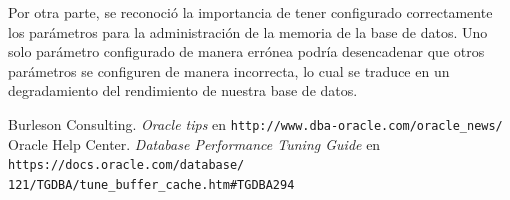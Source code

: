 \documentclass{article}
\begin{document}
Por otra parte, se reconoció la importancia de tener configurado correctamente
los parámetros para la administración de la memoria de la base de datos. Uno
solo parámetro configurado de manera errónea podría desencadenar que otros
parámetros se configuren de manera incorrecta, lo cual se traduce en un
degradamiento del rendimiento de nuestra base de datos.

\begin{thebibliography}{99}
     Burleson Consulting. \textit{Oracle tips } en 
    \texttt{http://www.dba-oracle.com/oracle\_news/}
   Oracle Help Center. \textit{Database Performance Tuning 
    Guide} en \texttt{https://docs.oracle.com/database/\\%
    121/TGDBA/tune\_buffer\_cache.htm\#TGDBA294}
\end{thebibliography}
\end{document}
